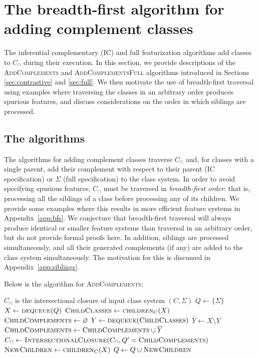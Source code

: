 \documentclass[12pt, oneside]{article}   	%
\begin{document}
\section{The breadth-first algorithm for adding complement classes}
\label{app:complements}

The inferential complementary (IC) and full featurization algorithms add classes to $C_\cap$ during their execution. In this section, we provide descriptions of the \textsc{AddComplements} and \textsc{AddComplementsFull} algorithms introduced in Sections \ref{sec:contrastive} and \ref{sec:full}. We then motivate the use of breadth-first traversal using examples where traversing the classes in an arbitrary order produces spurious features, and discuss considerations on the order in which siblings are processed.

\subsection{The algorithms}

The algorithms for adding complement classes traverse $C_\cap$ and, for classes with a single parent, add their complement with respect to their parent (IC specification) or $\Sigma$ (full specification) to the class system. In order to avoid specifying spurious features, $C_\cap$ must be traversed in \textit{breadth-first order}: that is, processing all the siblings of a class before processing any of its children. We provide some examples where this results in more efficient feature systems in Appendix~\ref{app:bfs}. We conjecture that breadth-first traversal will always produce identical or smaller feature systems than traversal in an arbitrary order, but do not provide formal proofs here. In addition, siblings are processed simultaneously, and all their generated complements (if any) are added to the class system simultaneously. The motivation for this is discussed in Appendix~\ref{app:siblings}.

Below is the algorithm for \textsc{AddComplements}:
\noindent \begin{algorithmic}
	\singlespacing
	\REQUIRE $C_\cap$ is the intersectional closure of input class system $(C, \Sigma)$
	\STATE
	\STATE $Q \leftarrow \{\Sigma\}$
	\STATE
	\STATE $X \leftarrow \textsc{dequeue}(Q)$
	\STATE $\textsc{ChildClasses} \leftarrow \textsc{children}_C(X)$
	\STATE $\textsc{ChildComplements} \leftarrow \varnothing$
	\STATE $Y \leftarrow \textsc{dequeue}(\textsc{ChildClasses})$
	\STATE $\overline{Y} \leftarrow X \setminus Y$
	\STATE $\textsc{ChildComplements} \leftarrow \textsc{ChildComplements} \cup \overline{Y}$
	\ENDIF
	\ENDWHILE
	\STATE $C_\cap \leftarrow \textsc{IntersectionalClosure}(C_\cap, Q' = \textsc{ChildComplements})$
	\STATE $\textsc{NewChildren} \leftarrow \textsc{children}_C(X)$
	\STATE $Q \leftarrow Q \cup \textsc{NewChildren}$
	\ENDWHILE
\end{algorithmic}
\doublespacing
\end{document}
